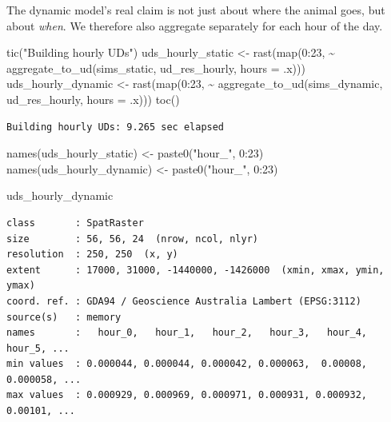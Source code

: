 \documentclass[
  letterpaper,
  DIV=11,
  numbers=noendperiod]{scrartcl}
\newenvironment{Shaded}{\begin{snugshade}}{\end{snugshade}}
\newcommand{\AttributeTok}[1]{\textcolor[rgb]{0.40,0.45,0.13}{#1}}
\newcommand{\DecValTok}[1]{\textcolor[rgb]{0.68,0.00,0.00}{#1}}
\newcommand{\FunctionTok}[1]{\textcolor[rgb]{0.28,0.35,0.67}{#1}}
\newcommand{\NormalTok}[1]{\textcolor[rgb]{0.00,0.23,0.31}{#1}}
\newcommand{\OtherTok}[1]{\textcolor[rgb]{0.00,0.23,0.31}{#1}}
\newcommand{\SpecialCharTok}[1]{\textcolor[rgb]{0.37,0.37,0.37}{#1}}
\newcommand{\StringTok}[1]{\textcolor[rgb]{0.13,0.47,0.30}{#1}}
\begin{document}
The dynamic model's real claim is not just about where the animal goes,
but about \emph{when}. We therefore also aggregate separately for each
hour of the day.

\begin{Shaded}
\begin{Highlighting}[]
\FunctionTok{tic}\NormalTok{(}\StringTok{"Building hourly UDs"}\NormalTok{)}
\NormalTok{uds\_hourly\_static  }\OtherTok{\textless{}{-}} \FunctionTok{rast}\NormalTok{(}\FunctionTok{map}\NormalTok{(}\DecValTok{0}\SpecialCharTok{:}\DecValTok{23}\NormalTok{, }\SpecialCharTok{\textasciitilde{}} \FunctionTok{aggregate\_to\_ud}\NormalTok{(sims\_static,  ud\_res\_hourly, }\AttributeTok{hours =}\NormalTok{ .x)))}
\NormalTok{uds\_hourly\_dynamic }\OtherTok{\textless{}{-}} \FunctionTok{rast}\NormalTok{(}\FunctionTok{map}\NormalTok{(}\DecValTok{0}\SpecialCharTok{:}\DecValTok{23}\NormalTok{, }\SpecialCharTok{\textasciitilde{}} \FunctionTok{aggregate\_to\_ud}\NormalTok{(sims\_dynamic, ud\_res\_hourly, }\AttributeTok{hours =}\NormalTok{ .x)))}
\FunctionTok{toc}\NormalTok{()}
\end{Highlighting}
\end{Shaded}

\begin{verbatim}
Building hourly UDs: 9.265 sec elapsed
\end{verbatim}

\begin{Shaded}
\begin{Highlighting}[]
\FunctionTok{names}\NormalTok{(uds\_hourly\_static)  }\OtherTok{\textless{}{-}} \FunctionTok{paste0}\NormalTok{(}\StringTok{"hour\_"}\NormalTok{, }\DecValTok{0}\SpecialCharTok{:}\DecValTok{23}\NormalTok{)}
\FunctionTok{names}\NormalTok{(uds\_hourly\_dynamic) }\OtherTok{\textless{}{-}} \FunctionTok{paste0}\NormalTok{(}\StringTok{"hour\_"}\NormalTok{, }\DecValTok{0}\SpecialCharTok{:}\DecValTok{23}\NormalTok{)}

\NormalTok{uds\_hourly\_dynamic}
\end{Highlighting}
\end{Shaded}

\begin{verbatim}
class       : SpatRaster
size        : 56, 56, 24  (nrow, ncol, nlyr)
resolution  : 250, 250  (x, y)
extent      : 17000, 31000, -1440000, -1426000  (xmin, xmax, ymin, ymax)
coord. ref. : GDA94 / Geoscience Australia Lambert (EPSG:3112)
source(s)   : memory
names       :   hour_0,   hour_1,   hour_2,   hour_3,   hour_4,   hour_5, ...
min values  : 0.000044, 0.000044, 0.000042, 0.000063,  0.00008, 0.000058, ...
max values  : 0.000929, 0.000969, 0.000971, 0.000931, 0.000932,  0.00101, ...
\end{verbatim}
\end{document}
